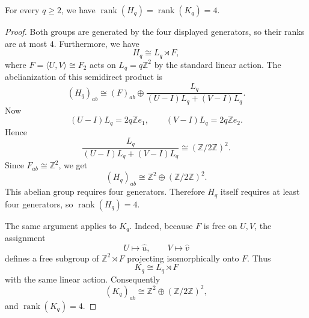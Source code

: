\documentclass[10pt,a4paper]{amsart}
\newcommand{\Z}{\mathbb Z}
\newcommand{\rank}{\operatorname{rank}}
\begin{document}
\begin{lem}
For every $q\geq 2$, we have $\rank(H_q)=\rank(K_q)=4.$
\end{lem}

\begin{proof}
Both groups are generated by the four displayed generators, so their ranks are
at most $4$. Furthermore, we have
\[
H_q\cong L_q\rtimes F,
\]
where $F=\langle U,V\rangle\cong F_2$ acts on $L_q=q\Z^2$ by the standard linear
action.  The abelianization of this semidirect product is
\[
(H_q)_{ab}\cong
(F)_{ab}\oplus
\frac{L_q}{(U-I)L_q+(V-I)L_q}.
\]
Now
\[
(U-I)L_q=2q\Z e_1,
\qquad
(V-I)L_q=2q\Z e_2.
\]
Hence
\[
\frac{L_q}{(U-I)L_q+(V-I)L_q}
\cong
(\Z/2\Z)^2.
\]
Since $F_{ab}\cong \Z^2$, we get
\[
(H_q)_{ab}\cong \Z^2\oplus (\Z/2\Z)^2.
\]
This abelian group requires four generators.  Therefore $H_q$ itself requires
at least four generators, so $\rank(H_q)=4$.

The same argument applies to $K_q$.  Indeed, because $F$ is free on $U,V$, the
assignment
\[
U\mapsto \hat u,
\qquad
V\mapsto \hat v
\]
defines a free subgroup of $\Z^2\rtimes F$ projecting isomorphically onto $F$.
Thus
\[
K_q\cong L_q\rtimes F
\]
with the same linear action.  Consequently
\[
(K_q)_{ab}\cong \Z^2\oplus (\Z/2\Z)^2,
\]
and $\rank(K_q)=4$.
\end{proof}
\end{document}
